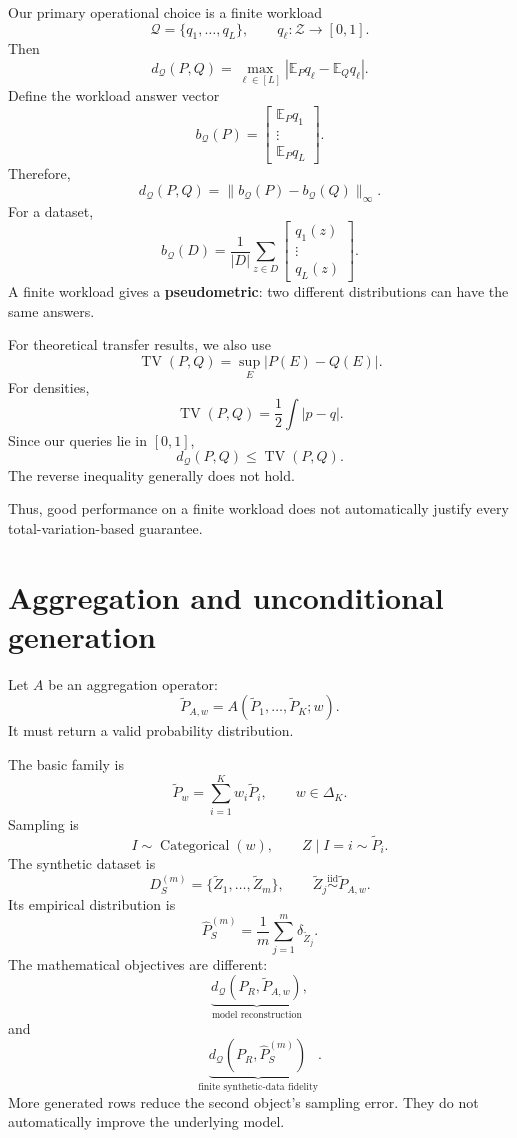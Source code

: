 \documentclass[11pt,a4paper]{article}
\begin{document}
Our primary operational choice is a finite workload
\[
\mathcal Q=\{q_1,\ldots,q_L\},\qquad q_\ell:\mathcal Z\rightarrow[0,1].
\]
Then
\[
\boxed{d_{\mathcal Q}(P,Q)=\max_{\ell\in[L]}
\left|\mathbb E_Pq_\ell-\mathbb E_Qq_\ell\right|.}
\]
Define the workload answer vector
\[
b_{\mathcal Q}(P)=\begin{bmatrix}\mathbb E_Pq_1\\\vdots\\\mathbb E_Pq_L\end{bmatrix}.
\]
Therefore,
\[
d_{\mathcal Q}(P,Q)=\|b_{\mathcal Q}(P)-b_{\mathcal Q}(Q)\|_\infty.
\]
For a dataset,
\[
b_{\mathcal Q}(D)=\frac1{|D|}\sum_{z\in D}
\begin{bmatrix}q_1(z)\\\vdots\\q_L(z)\end{bmatrix}.
\]
A finite workload gives a \textbf{pseudometric}: two different distributions can have the same answers.

For theoretical transfer results, we also use
\[
\boxed{\operatorname{TV}(P,Q)=\sup_E|P(E)-Q(E)|.}
\]
For densities,
\[
\operatorname{TV}(P,Q)=\frac12\int|p-q|.
\]
Since our queries lie in $[0,1]$,
\[
d_{\mathcal Q}(P,Q)\leq\operatorname{TV}(P,Q).
\]
The reverse inequality generally does not hold.

Thus, good performance on a finite workload does not automatically justify every total-variation-based guarantee.

\section{Aggregation and unconditional generation}
Let $A$ be an aggregation operator:
\[
\boxed{\widetilde P_{A,w}=A(\widetilde P_1,\ldots,\widetilde P_K;w).}
\]
It must return a valid probability distribution.

The basic family is
\[
\boxed{\widetilde P_w=\sum_{i=1}^{K}w_i\widetilde P_i,\qquad w\in\Delta_K.}
\]
Sampling is
\[
I\sim\operatorname{Categorical}(w),\qquad Z\mid I=i\sim\widetilde P_i.
\]
The synthetic dataset is
\[
D_S^{(m)}=\{\widetilde Z_1,\ldots,\widetilde Z_m\},\qquad
\widetilde Z_j\overset{\mathrm{iid}}{\sim}\widetilde P_{A,w}.
\]
Its empirical distribution is
\[
\widehat P_S^{(m)}=\frac1m\sum_{j=1}^{m}\delta_{\widetilde Z_j}.
\]
The mathematical objectives are different:
\[
\underbrace{d_{\mathcal Q}(P_R,\widetilde P_{A,w})}_{\text{model reconstruction}},
\]
and
\[
\underbrace{d_{\mathcal Q}(P_R,\widehat P_S^{(m)})}_{\text{finite synthetic-data fidelity}}.
\]
More generated rows reduce the second object's sampling error. They do not automatically improve the underlying model.
\end{document}

